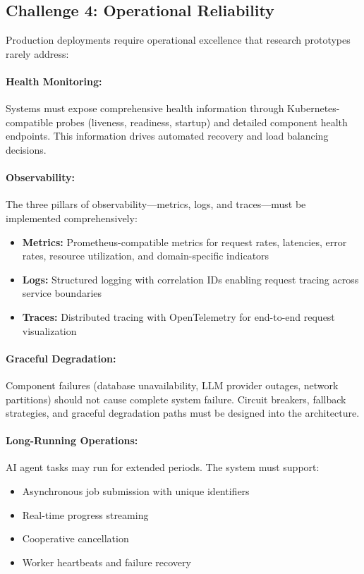 \subsection{Challenge 4: Operational Reliability}

Production deployments require operational excellence that research prototypes rarely address:

\paragraph{Health Monitoring:}
Systems must expose comprehensive health information through Kubernetes-compatible probes (liveness, readiness, startup) and detailed component health endpoints. This information drives automated recovery and load balancing decisions.

\paragraph{Observability:}
The three pillars of observability---metrics, logs, and traces---must be implemented comprehensively:
\begin{itemize}
    \item \textbf{Metrics:} Prometheus-compatible metrics for request rates, latencies, error rates, resource utilization, and domain-specific indicators
    \item \textbf{Logs:} Structured logging with correlation IDs enabling request tracing across service boundaries
    \item \textbf{Traces:} Distributed tracing with OpenTelemetry for end-to-end request visualization
\end{itemize}

\paragraph{Graceful Degradation:}
Component failures (database unavailability, LLM provider outages, network partitions) should not cause complete system failure. Circuit breakers, fallback strategies, and graceful degradation paths must be designed into the architecture.

\paragraph{Long-Running Operations:}
AI agent tasks may run for extended periods. The system must support:
\begin{itemize}
    \item Asynchronous job submission with unique identifiers
    \item Real-time progress streaming
    \item Cooperative cancellation
    \item Worker heartbeats and failure recovery
\end{itemize}

